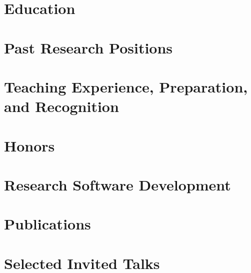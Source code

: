 


\thispagestyle{empty}					%
\pagestyle{fancy}			 		%

\vspace*{-0.8cm}
\centering 


\section{Education}
\def\edsep{-1.5mm}


\section{Past Research Positions}


\section{Teaching Experience, Preparation, and Recognition}


\section{Honors}


\section{Research Software Development}


\section{Publications}


\section{Selected Invited Talks}
\def\talksep{-2mm}
\def\talkyearsep{-1mm}




